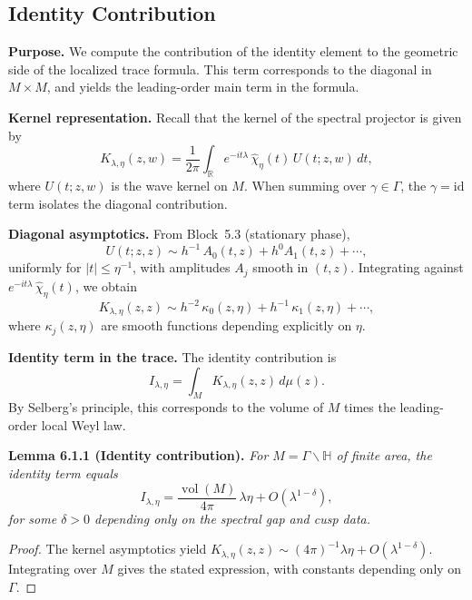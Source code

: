 
\subsection*{Identity Contribution}

\noindent\textbf{Purpose.}
We compute the contribution of the identity element to the geometric side of the localized trace formula. This term corresponds to the diagonal in $M\times M$, and yields the leading-order main term in the formula.

\medskip

\noindent\textbf{Kernel representation.}
Recall that the kernel of the spectral projector is given by
\[
  K_{\lambda,\eta}(z,w) = \frac{1}{2\pi}\int_{\mathbb{R}} e^{-it\lambda}\,
  \widehat{\chi}_\eta(t)\, U(t;z,w)\, dt,
\]
where $U(t;z,w)$ is the wave kernel on $M$.
When summing over $\gamma \in \Gamma$,
the $\gamma = \mathrm{id}$ term isolates the diagonal contribution.

\medskip

\noindent\textbf{Diagonal asymptotics.}
From Block~5.3 (stationary phase),
\[
  U(t;z,z) \sim h^{-1}\, A_0(t,z) + h^0 A_1(t,z) + \cdots,
\]
uniformly for $|t|\le \eta^{-1}$,
with amplitudes $A_j$ smooth in $(t,z)$.
Integrating against $e^{-it\lambda}\,\widehat{\chi}_\eta(t)$,
we obtain
\[
  K_{\lambda,\eta}(z,z) \sim h^{-2}\, \kappa_0(z,\eta) + h^{-1}\,\kappa_1(z,\eta) + \cdots,
\]
where $\kappa_j(z,\eta)$ are smooth functions depending explicitly on $\eta$.

\medskip

\noindent\textbf{Identity term in the trace.}
The identity contribution is
\[
  I_{\lambda,\eta} = \int_M K_{\lambda,\eta}(z,z)\, d\mu(z).
\]
By Selberg’s principle, this corresponds to the volume of $M$ times the leading-order local Weyl law.

\medskip

\noindent\textbf{Lemma 6.1.1 (Identity contribution).}
\emph{For $M=\Gamma\backslash \mathbb{H}$ of finite area,
the identity term equals}
\[
  I_{\lambda,\eta} = \frac{\operatorname{vol}(M)}{4\pi}\, \lambda \eta
  + O(\lambda^{1-\delta}),
\]
\emph{for some $\delta>0$ depending only on the spectral gap and cusp data.}

\begin{proof}
The kernel asymptotics yield $K_{\lambda,\eta}(z,z) \sim (4\pi)^{-1}\lambda \eta + O(\lambda^{1-\delta})$. Integrating over $M$ gives the stated expression, with constants depending only on $\Gamma$.
\end{proof}

